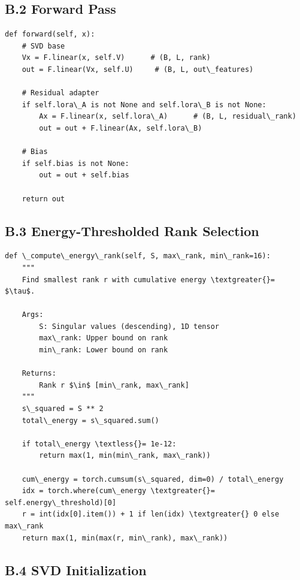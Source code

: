 \subsection{B.2 Forward Pass}

\begin{lstlisting}
def forward(self, x):
    # SVD base
    Vx = F.linear(x, self.V)      # (B, L, rank)
    out = F.linear(Vx, self.U)     # (B, L, out\_features)
    
    # Residual adapter
    if self.lora\_A is not None and self.lora\_B is not None:
        Ax = F.linear(x, self.lora\_A)      # (B, L, residual\_rank)
        out = out + F.linear(Ax, self.lora\_B)
    
    # Bias
    if self.bias is not None:
        out = out + self.bias
    
    return out
\end{lstlisting}

\subsection{B.3 Energy-Thresholded Rank Selection}

\begin{lstlisting}
def \_compute\_energy\_rank(self, S, max\_rank, min\_rank=16):
    """
    Find smallest rank r with cumulative energy \textgreater{}= $\tau$.
    
    Args:
        S: Singular values (descending), 1D tensor
        max\_rank: Upper bound on rank
        min\_rank: Lower bound on rank
    
    Returns:
        Rank r $\in$ [min\_rank, max\_rank]
    """
    s\_squared = S ** 2
    total\_energy = s\_squared.sum()
    
    if total\_energy \textless{}= 1e-12:
        return max(1, min(min\_rank, max\_rank))
    
    cum\_energy = torch.cumsum(s\_squared, dim=0) / total\_energy
    idx = torch.where(cum\_energy \textgreater{}= self.energy\_threshold)[0]
    r = int(idx[0].item()) + 1 if len(idx) \textgreater{} 0 else max\_rank
    return max(1, min(max(r, min\_rank), max\_rank))
\end{lstlisting}

\subsection{B.4 SVD Initialization}

